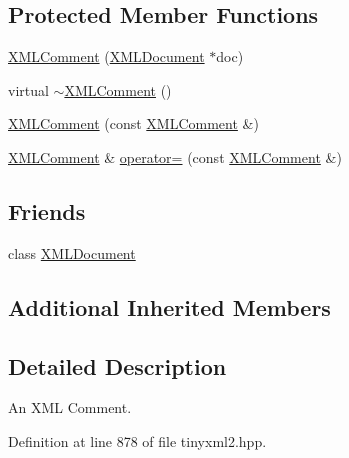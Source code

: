 \subsection*{Protected Member Functions}
\begin{DoxyCompactItemize}
\item 
\hyperlink{classtinyxml2_1_1_x_m_l_comment_ae6463adc3edd93a8e5a9b2b7e99cdf91}{X\-M\-L\-Comment} (\hyperlink{classtinyxml2_1_1_x_m_l_document}{X\-M\-L\-Document} $\ast$doc)
\item 
virtual \hyperlink{classtinyxml2_1_1_x_m_l_comment_ab592f69b47852455c1b32c5e31e453d0}{$\sim$\-X\-M\-L\-Comment} ()
\item 
\hyperlink{classtinyxml2_1_1_x_m_l_comment_aa0a9aae0850ac0e70d3cd20f6cb44447}{X\-M\-L\-Comment} (const \hyperlink{classtinyxml2_1_1_x_m_l_comment}{X\-M\-L\-Comment} \&)
\item 
\hyperlink{classtinyxml2_1_1_x_m_l_comment}{X\-M\-L\-Comment} \& \hyperlink{classtinyxml2_1_1_x_m_l_comment_ac8de55f8381d110740772e6bf6f5755a}{operator=} (const \hyperlink{classtinyxml2_1_1_x_m_l_comment}{X\-M\-L\-Comment} \&)
\end{DoxyCompactItemize}
\subsection*{Friends}
\begin{DoxyCompactItemize}
\item 
class \hyperlink{classtinyxml2_1_1_x_m_l_comment_a4eee3bda60c60a30e4e8cd4ea91c4c6e}{X\-M\-L\-Document}
\end{DoxyCompactItemize}
\subsection*{Additional Inherited Members}


\subsection{Detailed Description}
An X\-M\-L Comment. 

Definition at line 878 of file tinyxml2.\-hpp.



